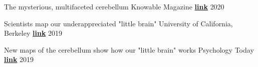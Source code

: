 \begin{cvhonors}

  \cvhonor
    {The mysterious, multifaceted cerebellum} %
    {Knowable Magazine}
    {\href{https://knowablemagazine.org/article/mind/2020/what-does-the-cerebellum-do}{\textbf{link}}}
    {2020}

  \cvhonor
    {Scientists map our underappreciated "little brain"} %
    {University of California, Berkeley}
    {\href{https://news.berkeley.edu/story_jump/cerebellum-map/}{\textbf{link}}}
    {2019}
    
  \cvhonor
    {New maps of the cerebellum show how our "little brain" works} %
    {Psychology Today}
    {\href{https://www.psychologytoday.com/us/blog/the-athletes-way/201907/new-maps-the-cerebellum-show-how-our-little-brain-works}{\textbf{link}}}
    {2019}
    

\end{cvhonors}
